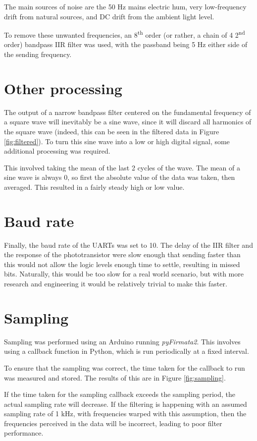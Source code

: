 \documentclass{article}
\begin{document}
\begin{multicols}{2}
The main sources of noise are the 50 Hz mains electric hum, very low-frequency drift from natural sources, and DC drift from the ambient light level. 

To remove these unwanted frequencies, an 8\textsuperscript{th} order (or rather, a chain of 4 2\textsuperscript{nd} order) bandpass IIR filter was used, with the passband being 5 Hz either side of the sending frequency. 

\section{Other processing}
The output of a narrow bandpass filter centered on the fundamental frequency of a square wave will inevitably be a sine wave, since it will discard all harmonics of the square wave (indeed, this can be seen in the filtered data in Figure \ref{fig:filtered}). To turn this sine wave into a low or high digital signal, some additional processing was required. 

This involved taking the mean of the last 2 cycles of the wave. The mean of a sine wave is always 0, so first the absolute value of the data was taken, then averaged. This resulted in a fairly steady high or low value.

\section{Baud rate}
Finally, the baud rate of the UARTs was set to 10. The delay of the IIR filter and the response of the phototransistor were slow enough that sending faster than this would not allow the logic levels enough time to settle, resulting in missed bits. Naturally, this would be too slow for a real world scenario, but with more research and engineering it would be relatively trivial to make this faster. 

\section{Sampling}
Sampling was performed using an Arduino running \textit{pyFirmata2}. This involves using a callback function in Python, which is run periodically at a fixed interval. 

To ensure that the sampling was correct, the time taken for the callback to run was measured and stored. The results of this are in Figure \ref{fig:sampling}. 

If the time taken for the sampling callback exceeds the sampling period, the actual sampling rate will decrease. If the filtering is happening with an assumed sampling rate of 1 kHz, with frequencies warped with this assumption, then the frequencies perceived in the data will be incorrect, leading to poor filter performance.


\end{multicols}
\end{document}
